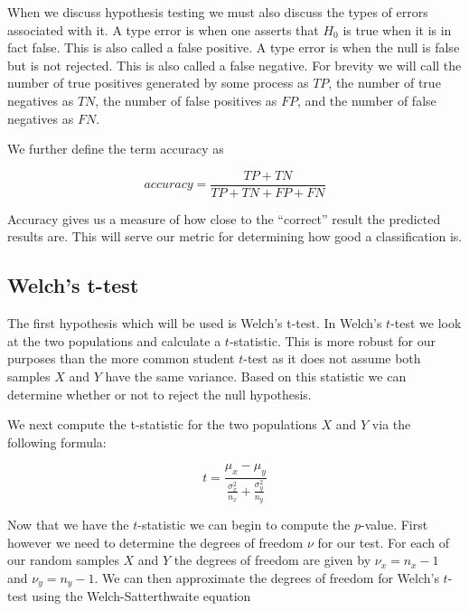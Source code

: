 When we discuss hypothesis testing we must also discuss the types of errors associated with it. A type  error is when one asserts that $H_0$ is true when it is in fact false. This is also called a false positive. A type  error is when the null is false but is not rejected. This is also called a false negative. For brevity we will call the number of true positives generated by some process as $TP$, the number of true negatives as $TN$, the number of false positives as $FP$, and the number of false negatives as $FN$. 

We further define the term accuracy as 

\begin{equation}\label{Accuracy}
	accuracy=\frac{TP+TN}{TP+TN+FP+FN}
\end{equation}

Accuracy gives us a measure of how close to the ``correct'' result the predicted results are. This will serve our metric for determining how good a classification is. 
\subsection{Welch's t-test}\label{sec:ttest}

The first hypothesis which will be used is Welch's t-test\cite{welch_generalization_1947}. In Welch's $t$-test we look at the two populations and calculate a $t$-statistic. This is more robust for our purposes than the more common student $t$-test as it does not assume both samples $X$ and $Y$ have the same variance. Based on this statistic we can determine whether or not to reject the null hypothesis.  

We next compute the t-statistic for the two populations $X$ and $Y$ via the following formula:

	 \begin{equation}\label{t-stat}
		t = \frac{  \mu_x - \mu_y }{ \frac{\sigma_{x}^2}{n_x} + \frac{\sigma_{y}^2}{n_y}   }
	 \end{equation}

Now that we have the $t$-statistic we can begin to compute the $p$-value. First however we need to determine the degrees of freedom $\nu$ for our test. For each of our random samples $X$ and $Y$ the degrees of freedom are given by $\nu_x = n_x -1$ and $\nu_y = n_y-1$. We can then approximate the degrees of freedom for Welch's $t$-test using the Welch-Satterthwaite equation ~\cite{satterthwaite1946approximate,welch_generalization_1947}

